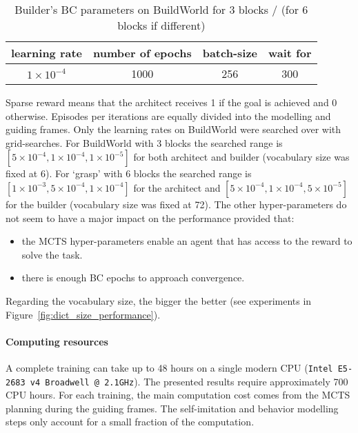 \begin{table}[h!]
    \centering
    \begin{tabular}{cccc}
         learning rate & number of epochs  & batch-size & wait for \\
         \hline
         $1\times10^{-4}$ & 1000 & 256 & 300
    \end{tabular}
    \caption{Builder's BC parameters on BuildWorld for 3 blocks / (for 6 blocks if different)}
\end{table}
Sparse reward means that the architect receives 1 if the goal is achieved and 0 otherwise. Episodes per iterations are equally divided into the modelling and guiding frames. Only the learning rates on BuildWorld were searched over with grid-searches. For BuildWorld with 3 blocks the searched range is $[ 5\times10^{-4}, 1\times10^{-4}, 1\times10^{-5}]$ for both architect and builder (vocabulary size was fixed at 6). For `grasp' with 6 blocks the searched range is $[ 1\times10^{-3}, 5\times10^{-4}, 1\times10^{-4}]$ for the architect and $[ 5\times10^{-4}, 1\times10^{-4}, 5\times10^{-5}]$ for the builder (vocabulary size was fixed at 72). The other hyper-parameters do not seem to have a major impact on the performance provided that:
\begin{itemize}[noitemsep]
    \item the MCTS hyper-parameters enable an agent that has access to the reward to solve the task.
    \item there is enough BC epochs to approach convergence.
\end{itemize}Regarding the vocabulary size, the bigger the better (see experiments in Figure~\ref{fig:dict_size_performance}). 

\paragraph{Computing resources}

A complete \abig training can take up to 48 hours on a single modern CPU (\texttt{Intel E5-2683 v4 Broadwell @ 2.1GHz}). The presented results require approximately 700 CPU hours. For each training, the main computation cost comes from the MCTS planning during the guiding frames. The self-imitation and behavior modelling steps only account for a small fraction of the computation. 


